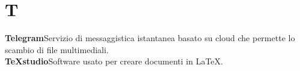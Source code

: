 \newpage
\section{T}\label{l:T}

\textbf{Telegram}\newline Servizio di messaggistica istantanea basato su cloud che permette lo scambio di file multimediali.\\
\newline
\textbf{TeXstudio}\newline Software usato per creare documenti in \LaTeX.
